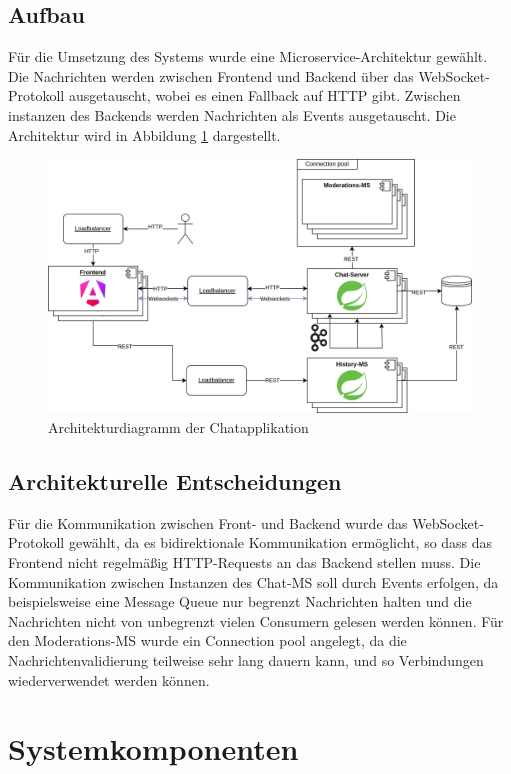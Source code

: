 \documentclass[12pt]{report}
\begin{document}
\subsection{Aufbau}
Für die Umsetzung des Systems wurde eine Microservice-Architektur gewählt. Die Nachrichten werden zwischen Frontend und Backend über das WebSocket-Protokoll ausgetauscht, wobei es einen Fallback auf HTTP gibt. Zwischen instanzen des Backends werden Nachrichten als Events ausgetauscht. Die Architektur wird in Abbildung \ref{fig:Architektur} dargestellt.
\begin{figure}[htbp]
	\centering
	\includegraphics[width=\linewidth]{architektur}
	\caption{Architekturdiagramm der Chatapplikation}
	\label{fig:Architektur}
\end{figure}
\subsection{Architekturelle Entscheidungen}
Für die Kommunikation zwischen Front- und Backend wurde das WebSocket-Protokoll gewählt, da es bidirektionale Kommunikation ermöglicht, so dass das Frontend nicht regelmäßig HTTP-Requests an das Backend stellen muss. 
Die Kommunikation zwischen Instanzen des Chat-MS soll durch Events erfolgen, da beispielsweise eine Message Queue nur begrenzt Nachrichten halten und die Nachrichten nicht von unbegrenzt vielen Consumern gelesen werden können.
Für den Moderations-MS wurde ein Connection pool angelegt, da die Nachrichtenvalidierung teilweise sehr lang dauern kann, und so Verbindungen wiederverwendet werden können.
\section{Systemkomponenten}
\end{document}
